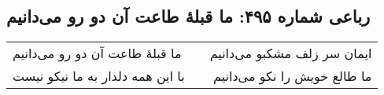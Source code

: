 \begin{center}
\section*{رباعی شماره ۴۹۵: ما قبلهٔ طاعت آن دو رو می‌دانیم}
\label{sec:sh495}
\begin{longtable}{l p{0.5cm} r}
ما قبلهٔ طاعت آن دو رو می‌دانیم
&&
ایمان سر زلف مشکبو می‌دانیم
\\
با این همه دلدار به ما نیکو نیست
&&
ما طالع خویش را نکو می‌دانیم
\\
\end{longtable}
\end{center}
